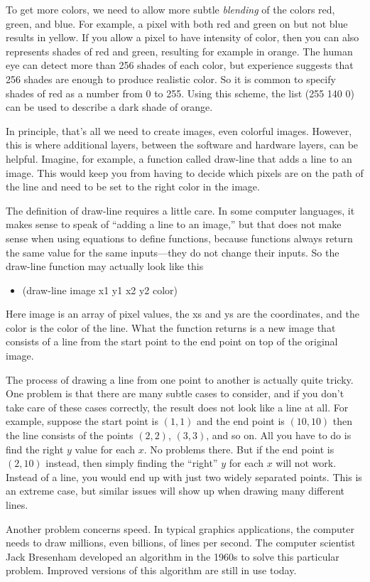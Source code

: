 To get more colors, we need to allow more subtle \emph{blending} of the
colors red, green, and blue. For example, a pixel with both red and green
on but not blue results in yellow. If you allow a pixel to have intensity
of color, then you can also represents shades of red and green, resulting
for example in orange. The human eye can detect more than 256 shades of
each color, but experience suggests that 256 shades are enough to produce
realistic color. So it is common to specify shades of red as a number from
0 to 255. Using this scheme, the list \textsf{(255 140 0)} can be used to
describe a dark shade of orange.

In principle, that's all we need to create images, even colorful images.
However, this is where additional layers, between the software and hardware
layers, can be helpful. Imagine, for example, a function called \textsf{draw-line}
that adds a line to an image. This would keep you from having to decide
which pixels are on the path of the line and need to be set to the right
color in the image.

The definition of \textsf{draw-line} requires a little care. In some
computer languages, it makes sense to speak of ``adding a line to an image,''
but that does not make sense when using equations to define functions, because
functions always return the same value for the same inputs---they do not change
their inputs. So the \textsf{draw-line} function may actually look like this
\begin{itemize}
    \item \textsf{(draw-line image x1 y1 x2 y2 color)}
\end{itemize}
Here \textsf{image} is an array of pixel values, the xs and ys are the
coordinates, and the \textsf{color} is the color of the line.
What the function returns is a new image that consists of a line from the 
start point to the end point on top of the original image.

\begin{aside}
The process of drawing a line from one point to another is actually quite
tricky. One problem is that there are many subtle cases to consider, and
if you don't take care of these cases correctly, the result does not look
like a line at all. For example, suppose the start point is $(1,1)$ and
the end point is $(10,10)$ then the line consists of the points $(2,2)$,
$(3,3)$, and so on. All you have to do is find the right $y$ value for
each $x$. No problems there. But if the end point is $(2,10)$ instead,
then simply finding the ``right'' $y$ for each $x$ will not work. Instead
of a line, you would end up with just two widely separated points. This
is an extreme case, but similar issues will show up when drawing many 
different lines.

Another problem concerns speed. In typical graphics applications, the
computer needs to draw millions, even billions, of lines per second.
The computer scientist Jack Bresenham developed an algorithm in the
1960s to solve this particular problem. Improved versions of this 
algorithm are still in use today.
\end{aside}

